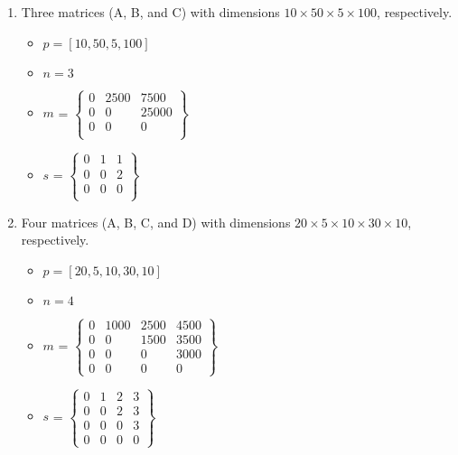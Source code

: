 \documentclass{article}[12pt]
\begin{document}
\pagebreak
\begin{enumerate}
  \item Three matrices (A, B, and C) with dimensions 
    $10 \times 50 \times 5 \times 100$, respectively.
    \begin{itemize}
      \item $p = [10, 50, 5, 100]$
      \item $n = 3$
      \item $m$ =
        $\begin{Bmatrix}
          0 & 2500 & 7500 \\
          0 & 0 & 25000 \\
          0 & 0 & 0 \\
        \end{Bmatrix}$
      \item $s$ =
        $\begin{Bmatrix}
          0 & 1 & 1 \\
          0 & 0 & 2 \\
          0 & 0 & 0 \\
        \end{Bmatrix}$
    \end{itemize}
  \item Four matrices (A, B, C, and D) with dimensions
    $20 \times 5 \times 10 \times 30 \times 10$, respectively.
    \begin{itemize}
      \item $p = [20, 5, 10, 30, 10]$
      \item $n = 4$
      \item $m$ =
        $\begin{Bmatrix}
          0 & 1000 & 2500 & 4500 \\
          0 & 0 & 1500 & 3500 \\
          0 & 0 & 0 & 3000 \\
          0 & 0 & 0 & 0
        \end{Bmatrix}$

      \item $s$ =
        $\begin{Bmatrix}
          0 & 1 & 2 & 3 \\
          0 & 0 & 2 & 3 \\
          0 & 0 & 0 & 3 \\
          0 & 0 & 0 & 0
        \end{Bmatrix}$

    \end{itemize}
\end{enumerate}
\end{document}
